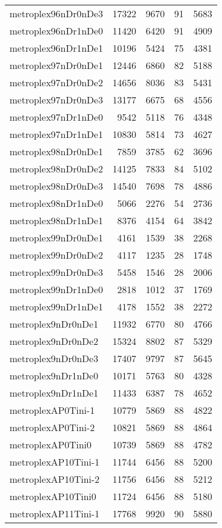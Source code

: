 \begin{longtable}{lrrrr}
metroplex96nDr0nDe3 & 17322 & 9670 & 91 & 5683 \\
metroplex96nDr1nDe0 & 11420 & 6420 & 91 & 4909 \\
metroplex96nDr1nDe1 & 10196 & 5424 & 75 & 4381 \\
metroplex97nDr0nDe1 & 12446 & 6860 & 82 & 5188 \\
metroplex97nDr0nDe2 & 14656 & 8036 & 83 & 5431 \\
metroplex97nDr0nDe3 & 13177 & 6675 & 68 & 4556 \\
metroplex97nDr1nDe0 & 9542 & 5118 & 76 & 4348 \\
metroplex97nDr1nDe1 & 10830 & 5814 & 73 & 4627 \\
metroplex98nDr0nDe1 & 7859 & 3785 & 62 & 3696 \\
metroplex98nDr0nDe2 & 14125 & 7833 & 84 & 5102 \\
metroplex98nDr0nDe3 & 14540 & 7698 & 78 & 4886 \\
metroplex98nDr1nDe0 & 5066 & 2276 & 54 & 2736 \\
metroplex98nDr1nDe1 & 8376 & 4154 & 64 & 3842 \\
metroplex99nDr0nDe1 & 4161 & 1539 & 38 & 2268 \\
metroplex99nDr0nDe2 & 4117 & 1235 & 28 & 1748 \\
metroplex99nDr0nDe3 & 5458 & 1546 & 28 & 2006 \\
metroplex99nDr1nDe0 & 2818 & 1012 & 37 & 1769 \\
metroplex99nDr1nDe1 & 4178 & 1552 & 38 & 2272 \\
metroplex9nDr0nDe1 & 11932 & 6770 & 80 & 4766 \\
metroplex9nDr0nDe2 & 15324 & 8802 & 87 & 5329 \\
metroplex9nDr0nDe3 & 17407 & 9797 & 87 & 5645 \\
metroplex9nDr1nDe0 & 10171 & 5763 & 80 & 4328 \\
metroplex9nDr1nDe1 & 11433 & 6387 & 78 & 4652 \\
metroplexAP0Tini-1 & 10779 & 5869 & 88 & 4822 \\
metroplexAP0Tini-2 & 10821 & 5869 & 88 & 4864 \\
metroplexAP0Tini0 & 10739 & 5869 & 88 & 4782 \\
metroplexAP10Tini-1 & 11744 & 6456 & 88 & 5200 \\
metroplexAP10Tini-2 & 11756 & 6456 & 88 & 5212 \\
metroplexAP10Tini0 & 11724 & 6456 & 88 & 5180 \\
metroplexAP11Tini-1 & 17768 & 9920 & 90 & 5880 \\

\end{longtable}
